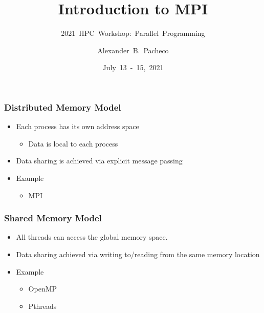 \documentclass[10pt,t]{beamer}
\title{Introduction to MPI}
\subtitle{2021~HPC~Workshop:~Parallel~Programming}
\author{\large{Alexander~B.~Pacheco}}
\institute[Lehigh University Research Computing]{\href{http://researchcomputing.lehigh.edu}{Research~Computing}}
\date{July~13~-~15,~2021}
\begin{document}
\begin{frame}
  \titlepage
\end{frame}

\begin{frame}
  \frametitle{Distributed Memory Model}
    \begin{itemize}
      \item Each process has its own address space
      \begin{itemize}
        \item Data is local to each process
      \end{itemize}
      \item Data sharing is achieved via explicit message passing
      \item Example
      \begin{itemize}
        \item MPI
      \end{itemize}
    \end{itemize}

    
\end{frame}

\begin{frame}
  \frametitle{Shared Memory Model}
    \begin{itemize}
      \item All threads can access the global memory space.
      \item Data sharing achieved via writing to/reading from the same memory location
      \item Example
      \begin{itemize}
        \item OpenMP
        \item Pthreads
      \end{itemize}
    \end{itemize}
    
\end{frame}
\end{document}
